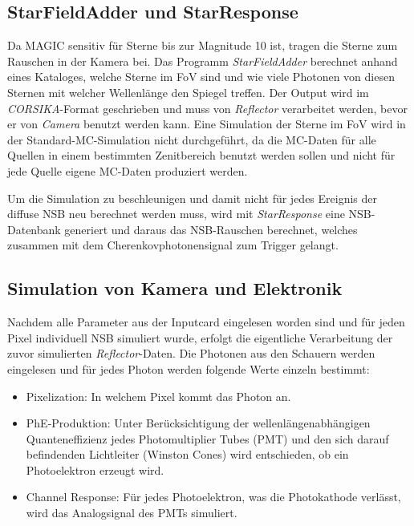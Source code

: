 \subsection{StarFieldAdder und StarResponse}
Da MAGIC sensitiv für Sterne bis zur Magnitude 10 ist, tragen die Sterne zum Rauschen in der Kamera bei.
Das Programm \textit{StarFieldAdder} berechnet anhand eines Kataloges, welche Sterne im FoV sind und wie viele Photonen von diesen Sternen mit welcher Wellenlänge den Spiegel treffen.
Der Output wird im \textit{CORSIKA}-Format geschrieben und muss von \textit{Reflector} verarbeitet werden, bevor er von \textit{Camera} benutzt werden kann.
Eine Simulation der Sterne im FoV wird in der Standard-MC-Simulation nicht durchgeführt, da die MC-Daten für alle Quellen in einem bestimmten Zenitbereich benutzt werden sollen und nicht für jede Quelle eigene MC-Daten produziert werden.

Um die Simulation zu beschleunigen und damit nicht für jedes Ereignis der diffuse NSB neu berechnet werden muss, wird mit \textit{StarResponse} eine NSB-Datenbank generiert und daraus das NSB-Rauschen berechnet, welches zusammen mit dem Cherenkovphotonensignal zum Trigger gelangt.

\subsection{Simulation von Kamera und Elektronik}
Nachdem alle Parameter aus der Inputcard eingelesen worden sind und für jeden Pixel individuell NSB simuliert wurde, erfolgt die eigentliche Verarbeitung der zuvor simulierten \textit{Reflector}-Daten.
Die Photonen aus den Schauern werden eingelesen und für jedes Photon werden folgende Werte einzeln bestimmt:

\begin{itemize}
 \item Pixelization: In welchem Pixel kommt das Photon an.
 \item PhE-Produktion: Unter Berücksichtigung der wellenlängenabhängigen Quanteneffizienz jedes Photomultiplier Tubes (PMT) und den sich darauf befindenden Lichtleiter (Winston Cones) wird entschieden, ob ein Photoelektron erzeugt wird.
 \item Channel Response: Für jedes Photoelektron, was die Photokathode verlässt, wird das Analogsignal des PMTs simuliert.
\end{itemize}

